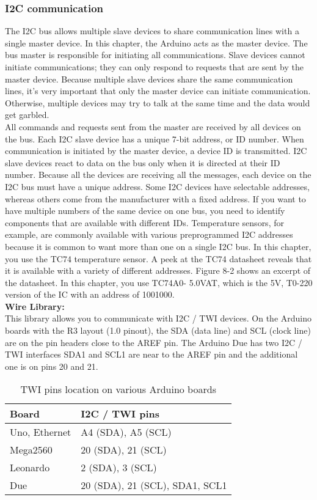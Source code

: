 \documentclass[12pt]{article}
\begin{document}
\subsubsection{I2C communication}
\hspace*{1 cm}The I2C bus allows multiple slave devices to share communication lines with a single master device. In this chapter, the Arduino acts as the master device. The bus master is responsible for initiating all communications. Slave devices cannot initiate communications; they can only respond to requests that are sent by the master device. Because multiple slave devices share the same communication lines, it's very important that only the master device can initiate communication. Otherwise, multiple devices may try to talk at the same time and the data would get garbled.\\
\hspace*{1 cm}All commands and requests sent from the master are received by all devices on the bus. Each I2C slave device has a unique 7-bit address, or ID number. When communication is initiated by the master device, a device ID is transmitted. I2C slave devices react to data on the bus only when it is directed at their ID number. Because all the devices are receiving all the messages, each device on the I2C bus must have a unique address. Some I2C devices have selectable addresses, whereas others come from the manufacturer with a fixed address. If you want to have multiple numbers of the same device on one bus, you need to identify components that are available with different IDs. Temperature sensors, for example, are commonly available with various preprogrammed I2C addresses because it is common to want more than one on a single I2C bus. In this chapter, you use the TC74 temperature sensor. A peek at the TC74 datasheet reveals that it is available with a variety of different addresses. Figure 8-2 shows an excerpt of the datasheet. In this chapter, you use TC74A0- 5.0VAT, which is the 5V, T0-220 version of the IC with an address of 1001000.\\
\textbf{Wire Library:}\\
\hspace*{1 cm}This library allows you to communicate with I2C / TWI devices. On the Arduino boards with the R3 layout (1.0 pinout), the SDA (data line) and SCL (clock line) are on the pin headers close to the AREF pin. The Arduino Due has two I2C / TWI interfaces SDA1 and SCL1 are near to the AREF pin and the additional one is on pins 20 and 21.
\begin{table}[h]
\centering
\begin{tabular}{| l | l |}
\hline
\textbf{Board} & \textbf{I2C / TWI pins} \\
\hline
Uno, Ethernet & A4 (SDA), A5 (SCL) \\
Mega2560 & 20 (SDA), 21 (SCL) \\
Leonardo & 2 (SDA), 3 (SCL) \\
Due & 20 (SDA), 21 (SCL), SDA1, SCL1 \\
\hline
\end{tabular}
\caption{TWI pins location on various Arduino boards}
\end{table}
\end{document}

